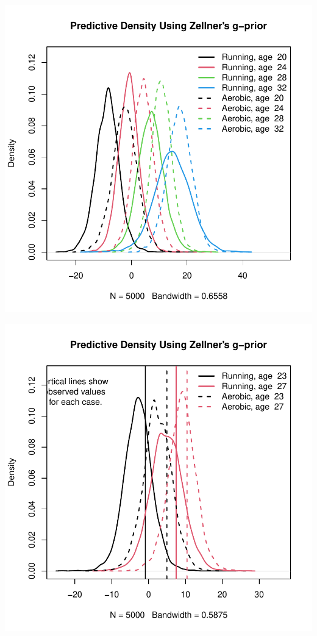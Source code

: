 \documentclass[12pt, a4paper]{article}
\begin{document}
\includegraphics{Thesis-017}

\clearpage


\includegraphics{Thesis-018}
\end{document}
